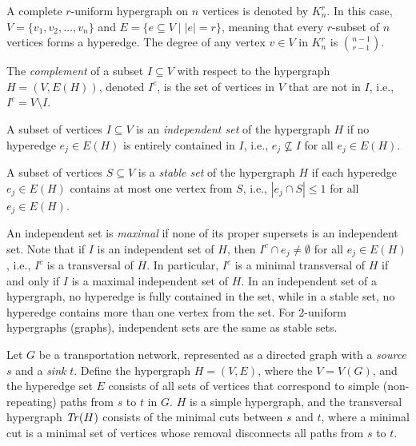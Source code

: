 \begin{example}
A complete $r$-uniform hypergraph on $n$ vertices is denoted by $K_n^r$. In this case, $V=\{v_1,v_2,\dots,v_n\}$ and $E=\{e\subseteq V\mid |e|=r\}$, meaning that every $r$-subset of $n$ vertices forms a hyperedge. The degree of any vertex $v\in V$ in $K_n^r$ is $\binom{n-1}{r-1}$.
\end{example}

\begin{definition}
The \emph{complement} of a subset $I\subseteq V$ with respect to the hypergraph $H=(V,E(H))$, denoted $I^c$, is the set of vertices in $V$ that are not in $I$, i.e., $I^c=V\setminus I$.
\end{definition}

\begin{definition}
A subset of vertices $I\subseteq V$ is an \emph{independent set} of the hypergraph $H$ if no hyperedge $e_j\in E(H)$ is entirely contained in $I$, i.e., $e_j\nsubseteq I$ for all $e_j\in E(H)$.
\end{definition}

\begin{definition}
A subset of vertices $S\subseteq V$ is a \emph{stable set} of the hypergraph $H$ if each hyperedge $e_j\in E(H)$ contains at most one vertex from $S$, i.e., $|e_j\cap S|\leq 1$ for all $e_j\in E(H)$.
\end{definition}

An independent set is \emph{maximal} if none of its proper supersets is an independent set. Note that if $I$ is an independent set of $H$, then $I^c\cap e_j\neq\emptyset$ for all $e_j\in E(H)$, i.e., $I^c$ is a transversal of $H$. In particular, $I^c$ is a minimal transversal of $H$ if and only if $I$ is a maximal independent set of $H$. In an independent set of a hypergraph, no hyperedge is fully contained in the set, while in a stable set, no hyperedge contains more than one vertex from the set. For 2-uniform hypergraphs (graphs), independent sets are the same as stable sets.

\begin{example}
Let $G$ be a transportation network, represented as a directed graph with a \emph{source} $s$ and a \emph{sink} $t$. Define the hypergraph $H=(V,E)$, where the $V=V(G)$, and the hyperedge set $E$ consists of all sets of vertices that correspond to simple (non-repeating) paths from $s$ to $t$ in $G$. $H$ is a simple hypergraph, and the transversal hypergraph $\mathit{Tr}(H)$ consists of the minimal cuts between $s$ and $t$, where a minimal cut is a minimal set of vertices whose removal disconnects all paths from $s$ to $t$.
\end{example}

